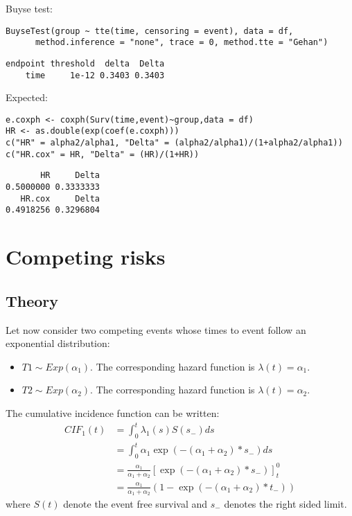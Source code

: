 \documentclass{article}
\begin{document}
Buyse test:
\lstset{language=r,label= ,caption= ,captionpos=b,numbers=none}
\begin{lstlisting}
BuyseTest(group ~ tte(time, censoring = event), data = df,
	  method.inference = "none", trace = 0, method.tte = "Gehan")
\end{lstlisting}
\begin{verbatim}
endpoint threshold  delta  Delta
    time     1e-12 0.3403 0.3403
\end{verbatim}

Expected:
\lstset{language=r,label= ,caption= ,captionpos=b,numbers=none}
\begin{lstlisting}
e.coxph <- coxph(Surv(time,event)~group,data = df)
HR <- as.double(exp(coef(e.coxph)))
c("HR" = alpha2/alpha1, "Delta" = (alpha2/alpha1)/(1+alpha2/alpha1))
c("HR.cox" = HR, "Delta" = (HR)/(1+HR))
\end{lstlisting}

\begin{verbatim}
       HR     Delta 
0.5000000 0.3333333
   HR.cox     Delta 
0.4918256 0.3296804
\end{verbatim}

\clearpage

\section{Competing risks}
\label{sec:orga8d6f18}

\subsection{Theory}
\label{sec:orgd30e7b6}

Let now consider two competing events whose times to event follow an exponential distribution:
\begin{itemize}
\item \(T1 \sim Exp(\alpha_1)\). The corresponding hazard function is \(\lambda(t)=\alpha_1\).
\item \(T2 \sim Exp(\alpha_2)\). The corresponding hazard function is \(\lambda(t)=\alpha_2\).
\end{itemize}
The cumulative incidence function can be written:
\begin{align*}
CIF_1(t) &= \int_0^t \lambda_1(s) S(s_-) ds \\
&= \int_0^t \alpha_1 \exp(- (\alpha_1 + \alpha_2) * s_-) ds \\
&= \frac{\alpha_1}{\alpha_1 + \alpha_2} \left[ \exp(- (\alpha_1 + \alpha_2) * s_-)\right]_t^0 \\
&= \frac{\alpha_1}{\alpha_1 + \alpha_2} \left(1 - \exp(- (\alpha_1 + \alpha_2) * t_-)\right) 
\end{align*}
where \(S(t)\) denote the event free survival and \(s_-\) denotes the right sided limit.
\end{document}
